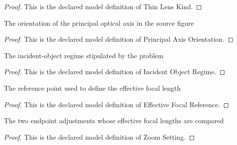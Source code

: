 \begin{proof}
  This is the declared model definition of Thin Lens Kind.
\end{proof}
\begin{definition}
  \label{def:physics:phyx-mini-0078:phyxminiproblems-problemphyxmini0078-principalaxisorientation}
  The orientation of the principal optical axis in the source figure
\end{definition}
\begin{proof}
  This is the declared model definition of Principal Axis Orientation.
\end{proof}
\begin{definition}
  \label{def:physics:phyx-mini-0078:phyxminiproblems-problemphyxmini0078-incidentobjectregime}
  The incident-object regime stipulated by the problem
\end{definition}
\begin{proof}
  This is the declared model definition of Incident Object Regime.
\end{proof}
\begin{definition}
  \label{def:physics:phyx-mini-0078:phyxminiproblems-problemphyxmini0078-effectivefocalreference}
  The reference point used to define the effective focal length
\end{definition}
\begin{proof}
  This is the declared model definition of Effective Focal Reference.
\end{proof}
\begin{definition}
  \label{def:physics:phyx-mini-0078:phyxminiproblems-problemphyxmini0078-zoomsetting}
  The two endpoint adjustments whose effective focal lengths are compared
\end{definition}
\begin{proof}
  This is the declared model definition of Zoom Setting.
\end{proof}

